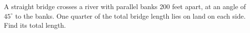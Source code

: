 A straight bridge crosses a river with parallel banks 200 feet apart, at an angle of $45^\circ$ to the banks. One quarter of the total bridge length lies on land on each side. Find its total length.
